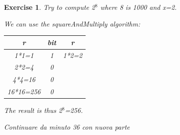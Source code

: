 \documentclass[a4paper, 12pt]{report}
\newtheorem{exercise}{\textbf{Exercise}}
\begin{document}
\begin{exercise}
	Try to compute 2$^8$ where 8 is 1000 and x=2.
	
	We can use the squareAndMultiply algorithm:
	\begin{table}[H]
		\centering
		\begin{tabular}{|c|c|c|}
			\hline
			\textbf{r} & \textbf{bit} & \textbf{r}\\ \hline
			1*1=1 & 1 & 1*2=2\\
			2*2=4 & 0 &\\
			4*4=16 & 0 &\\
			16*16=256 & 0 &\\ \hline
		\end{tabular}
	\end{table}
	The result is thus 2$^8$=256.
\end{exercise}
\vspace{50mm}
\textit{Continuare da minuto 36 con nuova parte}
\end{document}
